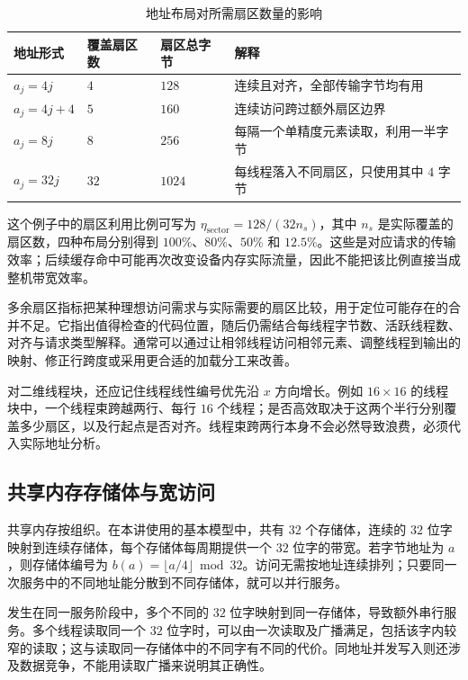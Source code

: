 \begin{table}[htbp]
\centering\small
\caption{地址布局对所需扇区数量的影响}
\label{l14:tab:sectors}
\begin{tabularx}{\textwidth}{@{}p{30mm}p{25mm}p{28mm}Y@{}}
\toprule
地址形式 & 覆盖扇区数 & 扇区总字节 & 解释\\
\midrule
$a_j=4j$ & $4$ & $128$ & 连续且对齐，全部传输字节均有用\\
$a_j=4j+4$ & $5$ & $160$ & 连续访问跨过额外扇区边界\\
$a_j=8j$ & $8$ & $256$ & 每隔一个单精度元素读取，利用一半字节\\
$a_j=32j$ & $32$ & $1024$ & 每线程落入不同扇区，只使用其中 $4$ 字节\\
\bottomrule
\end{tabularx}
\end{table}

这个例子中的扇区利用比例可写为 $\eta_{\mathrm{sector}}=128/(32n_s)$，其中 $n_s$ 是实际覆盖的扇区数，四种布局分别得到 $100\%$、$80\%$、$50\%$ 和 $12.5\%$。这些是对应请求的传输效率；后续缓存命中可能再次改变设备内存实际流量，因此不能把该比例直接当成整机带宽效率。

多余扇区指标把某种理想访问需求与实际需要的扇区比较，用于定位可能存在的合并不足。它指出值得检查的代码位置，随后仍需结合每线程字节数、活跃线程数、对齐与请求类型解释。通常可以通过让相邻线程访问相邻元素、调整线程到输出的映射、修正行跨度或采用更合适的加载分工来改善。

对二维线程块，还应记住线程线性编号优先沿 $x$ 方向增长。例如 $16\times16$ 的线程块中，一个线程束跨越两行、每行 $16$ 个线程；是否高效取决于这两个半行分别覆盖多少扇区，以及行起点是否对齐。线程束跨两行本身不会必然导致浪费，必须代入实际地址分析。

\subsection{共享内存存储体与宽访问}

共享内存按组织。在本讲使用的基本模型中，共有 $32$ 个存储体，连续的 $32$ 位字映射到连续存储体，每个存储体每周期提供一个 $32$ 位字的带宽。若字节地址为 $a$，则存储体编号为 $b(a)=\lfloor a/4\rfloor\bmod32$。访问无需按地址连续排列；只要同一次服务中的不同地址能分散到不同存储体，就可以并行服务。

发生在同一服务阶段中，多个不同的 $32$ 位字映射到同一存储体，导致额外串行服务。多个线程读取同一个 $32$ 位字时，可以由一次读取及广播满足，包括该字内较窄的读取；这与读取同一存储体中的不同字有不同的代价。同地址并发写入则还涉及数据竞争，不能用读取广播来说明其正确性。


